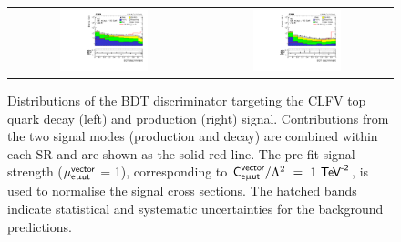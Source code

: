 \begin{figure}[tbh!]
 \begin{center}
 \begin{tabular}{cc}
 \includegraphics[width=0.48\textwidth]{figures/Part3/BDT/BDT_TT}&
 \includegraphics[width=0.48\textwidth]{figures/Part3/BDT/BDT_ST}\\
 \end{tabular}
 \caption{Distributions of the \ac{BDT} discriminator targeting the \ac{CLFV} top quark decay (left) and production (right) signal. Contributions from the two signal modes (production and decay) are combined within each \ac{SR} and are shown as the solid red line. The pre-fit signal strength ($\mu_{\textsf{e}\upmu\textsf{{u}t}}^{\textsf{vector}}$ = 1), corresponding to $\textsf{C}_{\textsf{e}\upmu\textsf{{u}t}}^{\textsf{vector}}/\mathrm{\Lambda}^2~=~1~\textsf{TeV}^{\textsf{-2}}$, is used to normalise the signal cross sections. The hatched bands indicate statistical and systematic uncertainties for the background predictions.}
 \label{fig:bdt_output}
 \end{center}
\end{figure}